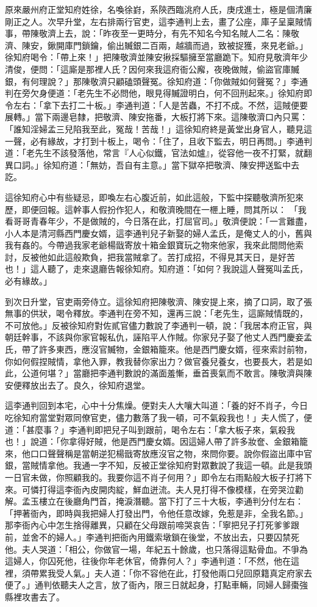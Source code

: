 原來嚴州府正堂知府姓徐，名喚徐崶，系陝西臨洮府人氏，庚戌進士，極是個清廉剛正之人。次早升堂，左右排兩行官吏，這李通判上去，畫了公座，庫子呈稟賊情事，帶陳敬濟上去，說：「昨夜至一更時分，有先不知名今知名賊人二名：陳敬濟、陳安，鍬開庫門鎖鑰，偷出贓銀二百兩，越牆而過，致被捉獲，來見老爺。」徐知府喝令：「帶上來！」把陳敬濟並陳安揪採驅擁至當廳跪下。知府見敬濟年少清俊，便問：「這廝是那裡人氏？因何來我這府衙公廨，夜晚做賊，偷盜官庫贓銀，有何理說？」那陳敬濟只顧磕頭聲冤。徐知府道：「你做賊如何聲冤？」李通判在旁欠身便道：「老先生不必問他，眼見得贓證明白，何不回刑起來。」徐知府即令左右：「拿下去打二十板。」李通判道：「人是苦蟲，不打不成。不然，這賊便要展轉。」當下兩邊皂隸，把敬濟、陳安拖番，大板打將下來。這陳敬濟口內只罵： 「誰知淫婦孟三兒陷我至此，冤哉！苦哉！」這徐知府終是黃堂出身官人，聽見這一聲，必有緣故，才打到十板上，喝令：「住了，且收下監去，明日再問。」李通判道：「老先生不該發落他，常言『人心似鐵，官法如爐』，從容他一夜不打緊，就翻異口詞。」徐知府道：「無妨，吾自有主意。」當下獄卒把敬濟、陳安押送監中去訖。

這徐知府心中有些疑忌，即喚左右心腹近前，如此這般，下監中探聽敬濟所犯來歷，即便回報。這幹事人假扮作犯人，和敬濟晚間在一㭱上睡，問其所以： 「我看哥哥青春年少，不是做賊的，今日落在此，打屈官司。」敬濟便說：「一言難盡，小人本是清河縣西門慶女婿，這李通判兒子新娶的婦人孟氏，是俺丈人的小，舊與我有姦的。今帶過我家老爺楊戩寄放十箱金銀寶玩之物來他家，我來此間問他索討，反被他如此這般欺負，把我當賊拿了。苦打成招，不得見其天日，是好苦也！」這人聽了，走來退廳告報徐知府。知府道：「如何？我說這人聲冤叫孟氏，必有緣故。」

到次日升堂，官吏兩旁侍立。這徐知府把陳敬濟、陳安提上來，摘了口詞，取了張無事的供狀，喝令釋放。李通判在旁不知，還再三說：「老先生，這廝賊情既的，不可放他。」反被徐知府對佐貳官儘力數說了李通判一頓，說：「我居本府正官，與朝廷幹事，不該與你家官報私仇，誣陷平人作賊。你家兒子娶了他丈人西門慶妾孟氏，帶了許多東西，應沒官贓物，金銀箱籠來。他是西門慶女婿，徑來索討前物，你如何假捏賊情，拿他入罪，教我替你家出力？做官養兒養女，也要長大，若是如此，公道何堪？」當廳把李通判數說的滿面羞慚，垂首喪氣而不敢言。陳敬濟與陳安便釋放出去了。良久，徐知府退堂。

這李通判回到本宅，心中十分焦燥。便對夫人大嚷大叫道：「養的好不肖子，今日吃徐知府當堂對眾同僚官吏，儘力數落了我一頓，可不氣殺我也！」夫人慌了，便道：「甚麼事？」李通判即把兒子叫到跟前，喝令左右：「拿大板子來，氣殺我也！」說道：「你拿得好賊，他是西門慶女婿。因這婦人帶了許多妝奩、金銀箱籠來，他口口聲聲稱是當朝逆犯楊戩寄放應沒官之物，來問你要。說你假盜出庫中官銀，當賊情拿他。我通一字不知，反被正堂徐知府對眾數說了我這一頓。此是我頭一日官未做，你照顧我的。我要你這不肖子何用？」即令左右雨點般大板子打將下來。可憐打得這李衙內皮開肉綻，鮮血迸流。夫人見打得不像模樣，在旁哭泣勸解。孟玉樓立在後廳角門首，掩淚潛聽。當下打了三十大板，李通判分付左右：「押著衙內，即時與我把婦人打發出門，令他任意改嫁，免惹是非，全我名節。」那李衙內心中怎生捨得離異，只顧在父母跟前啼哭哀告：「寧把兒子打死爹爹跟前，並舍不的婦人。」李通判把衙內用鐵索墩鎖在後堂，不放出去，只要囚禁死他。夫人哭道：「相公，你做官一場，年紀五十餘歲，也只落得這點骨血。不爭為這婦人，你囚死他，往後你年老休官，倚靠何人？」李通判道：「不然，他在這裡，須帶累我受人氣。」夫人道：「你不容他在此，打發他兩口兒回原籍真定府家去便了。」通判依聽夫人之言，放了衙內，限三日就起身，打點車輛，同婦人歸棗強縣裡攻書去了。


